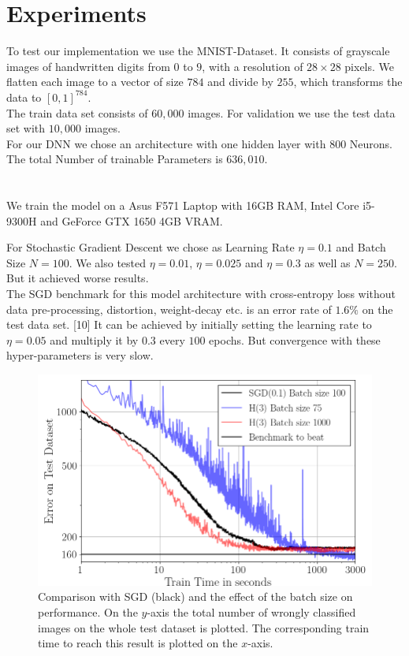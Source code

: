 \documentclass[conference]{IEEEtran}
\begin{document}
	\section{Experiments}
	\noindent
	To test our implementation we use the MNIST-Dataset.
	It consists of grayscale images of handwritten digits from $0$ to $9$, with a resolution of $28\times28$ pixels. We flatten each image to a vector of size $784$ and divide by $255$, which transforms the data to $[0,1]^{784}$.\\ The train data set consists of $60,000$ images. For validation we use the test data set with $10,000$ images.\\ 
	For our DNN we chose an architecture with one hidden layer with $800$ Neurons. The total Number of trainable Parameters is $636,010$.\\
	\\ \ \\ We train the model on a Asus F571 Laptop with 16GB RAM, Intel Core i5-9300H and GeForce GTX 1650 4GB VRAM.
	
	\noindent
	For Stochastic Gradient Descent we chose as Learning Rate $\eta=0.1$ and Batch Size $N=100$. We also tested $\eta=0.01$, $\eta=0.025$ and $\eta=0.3$ as well as $N=250$. But it achieved worse results. \\
	The SGD benchmark for this model architecture with cross-entropy loss without data pre-processing, distortion, weight-decay etc. is an error rate of $1.6\%$ on the test data set. [10] 
	It can be achieved by initially setting the learning rate to $\eta=0.05$ and multiply it by $0.3$ every $100$ epochs. But convergence with these hyper-parameters is very slow.	
	\begin{figure}[htbp]
	\centerline{\includegraphics[scale=0.52]{Plot_Batch_size.png}}
	\caption{Comparison with SGD (black) and the effect of the batch size on performance. On the $y$-axis the total number of wrongly classified images on the whole test dataset is plotted. The corresponding train time to reach this result is plotted on the $x$-axis.}
	\label{fig}
	\end{figure}	
\end{document}
